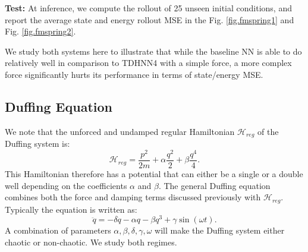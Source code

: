 \documentclass{article}
\begin{document}
\textbf{Test:} At inference, we compute the rollout of 25 unseen initial conditions, and report the average state and energy rollout MSE in the Fig. \ref{fig.fmspring1} and Fig. \ref{fig.fmspring2}.

We study both systems here to illustrate that while the baseline NN is able to do relatively well in comparison to TDHNN4 with a simple force, a more complex force significantly hurts its performance in terms of state/energy MSE.

\subsection{Duffing Equation}

We note that the unforced and undamped regular Hamiltonian $\mathcal{H}_{reg}$ of the Duffing system is:
\begin{equation}
\mathcal{H}_{reg} = \frac{p^2}{2m}+ \alpha \frac{q^2}{2} + \beta \frac{q^4}{4}.
\end{equation}
This Hamiltonian therefore has a potential that can either be a single or a double well depending on the coefficients $\alpha$ and $\beta$. The general Duffing equation combines both the force and damping terms discussed previously with $\mathcal{H}_{reg}$. Typically the equation is written as:
\begin{equation}
\ddot{q} = -\delta \dot{q} -\alpha q -\beta q^3 +\gamma \sin(\omega t). 
\end{equation}
A combination of parameters $\alpha,\beta,\delta,\gamma,\omega$ will make the Duffing system either chaotic or non-chaotic. We study both regimes.
\end{document}
